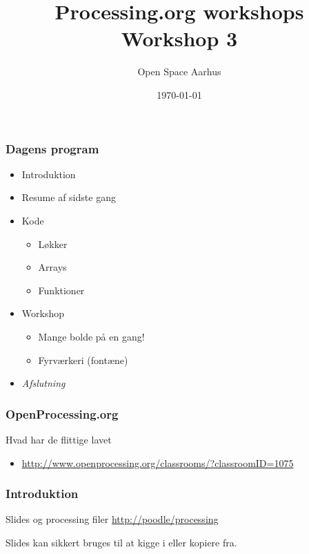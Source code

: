 \documentclass{beamer}
\title{Processing.org workshops\\Workshop 3}
\author{Open Space Aarhus}
\date{\today}
\institute[Bryggervej 30]{Bryggervej 30, 8240 Århus N}
\begin{document}
\begin{frame}[label=titlepage]
  \titlepage
\end{frame}

\begin{frame}
  \frametitle{Dagens program}
  \begin{itemize}
  \item Introduktion
  \item Resume af sidste gang
  \item Kode
    \begin{itemize}
    \item Løkker
    \item Arrays
    \item Funktioner
    \end{itemize}

  \item Workshop
    \begin{itemize}
    \item Mange bolde på en gang!
    \item Fyrværkeri (fontæne)
    \end{itemize}

  \item \emph{Afslutning}
    
  \end{itemize}						
\end{frame}


\begin{frame}
  \frametitle{OpenProcessing.org}
  \begin{block}{Hvad har de flittige lavet}
    \begin{itemize}
    \item \url{http://www.openprocessing.org/classrooms/?classroomID=1075}
    \end{itemize}
  \end{block}
\end{frame}


\begin{frame}
  \frametitle{Introduktion}
  
  \begin{block}{Slides og processing filer}
    \url{http://poodle/processing}   
  \end{block}
  {\tiny Slides kan sikkert bruges til at kigge i eller kopiere fra.}
\end{frame}
\end{document}
